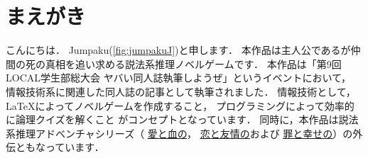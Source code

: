 \section*{まえがき}
こんにちは．
Jumpaku(\ref{fig:jumpakuJ})と申します．
本作品は主人公であるが仲間の死の真相を追い求める説法系推理ノベルゲームです．
本作品は「第9回LOCAL学生部総大会 ヤバい同人誌執筆しようぜ」というイベントにおいて，
情報技術系に関連した同人誌の記事として執筆されました．
情報技術として，\LaTeX によってノベルゲームを作成すること，
プログラミングによって効率的に論理クイズを解くこと
がコンセプトとなっています．
同時に，本作品は説法系推理アドベンチャシリーズ（
\href{http://jumpaku.hatenablog.com/entry/2016/04/14/002437}{\underline{愛と血の}}，
\href{http://jumpaku.hatenablog.com/entry/2016/07/24/032632}{\underline{恋と友情の}}および
\href{http://jumpaku.hatenablog.com/entry/2017/07/24/044918}{\underline{罪と幸せの}}）の外伝ともなっています．

